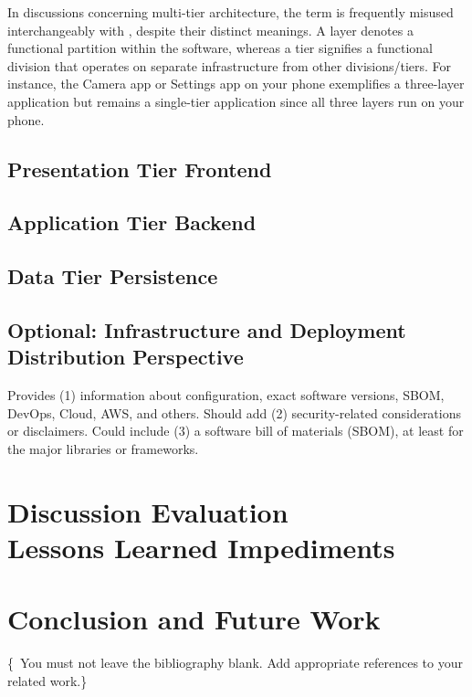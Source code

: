\documentclass[conference,a4paper,flushend]{cs-techrep}
\begin{document}
In discussions concerning multi-tier architecture, the term  is frequently misused interchangeably with , despite their distinct meanings. A layer denotes a functional partition within the software, whereas a tier signifies a functional division that operates on separate infrastructure from other divisions/tiers. For instance, the Camera app or Settings app on your phone exemplifies a three-layer application but remains a single-tier application since all three layers run on your phone.


\subsection{Presentation Tier \textbar{} Frontend}
\lipsum[13]

\subsection{Application Tier \textbar{} Backend \textbar{} }
\lipsum[14]

\subsection{Data Tier \textbar{} Persistence}
\lipsum[15]

\subsection{Optional: Infrastructure and Deployment \textbar{} Distribution Perspective \textbar{} }
Provides (1) information about configuration, exact software versions, SBOM, DevOps, Cloud, AWS, and others.
Should add (2) security-related considerations or disclaimers.
Could include (3) a software bill of materials (SBOM), at least for the major libraries or frameworks.


\section{Discussion \textbar{} Evaluation \textbar{} \\ Lessons Learned \textbar{} Impediments}
\lipsum[16]

\section{Conclusion and Future Work \textbar{} \\ }
\lipsum[17]


\{\,\faWarning{} You must not leave the bibliography blank. Add appropriate references to your related work.\}


\begingroup
\sloppy
\printbibliography[notcategory=selfref]
\endgroup 
    
\end{document}
